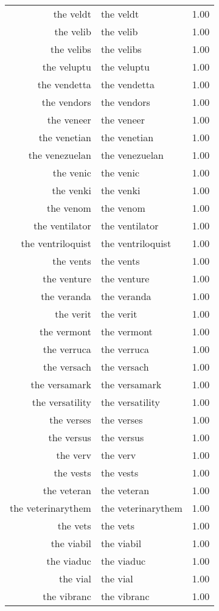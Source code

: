 \begin{table}[ht]
\begin{tabular}{rlr}
  the veldt & the veldt & 1.00 \\ 
  the velib & the velib & 1.00 \\ 
  the velibs & the velibs & 1.00 \\ 
  the veluptu & the veluptu & 1.00 \\ 
  the vendetta & the vendetta & 1.00 \\ 
  the vendors & the vendors & 1.00 \\ 
  the veneer & the veneer & 1.00 \\ 
  the venetian & the venetian & 1.00 \\ 
  the venezuelan & the venezuelan & 1.00 \\ 
  the venic & the venic & 1.00 \\ 
  the venki & the venki & 1.00 \\ 
  the venom & the venom & 1.00 \\ 
  the ventilator & the ventilator & 1.00 \\ 
  the ventriloquist & the ventriloquist & 1.00 \\ 
  the vents & the vents & 1.00 \\ 
  the venture & the venture & 1.00 \\ 
  the veranda & the veranda & 1.00 \\ 
  the verit & the verit & 1.00 \\ 
  the vermont & the vermont & 1.00 \\ 
  the verruca & the verruca & 1.00 \\ 
  the versach & the versach & 1.00 \\ 
  the versamark & the versamark & 1.00 \\ 
  the versatility & the versatility & 1.00 \\ 
  the verses & the verses & 1.00 \\ 
  the versus & the versus & 1.00 \\ 
  the verv & the verv & 1.00 \\ 
  the vests & the vests & 1.00 \\ 
  the veteran & the veteran & 1.00 \\ 
  the veterinarythem & the veterinarythem & 1.00 \\ 
  the vets & the vets & 1.00 \\ 
  the viabil & the viabil & 1.00 \\ 
  the viaduc & the viaduc & 1.00 \\ 
  the vial & the vial & 1.00 \\ 
  the vibranc & the vibranc & 1.00 \\ 

\end{tabular}
\end{table}
